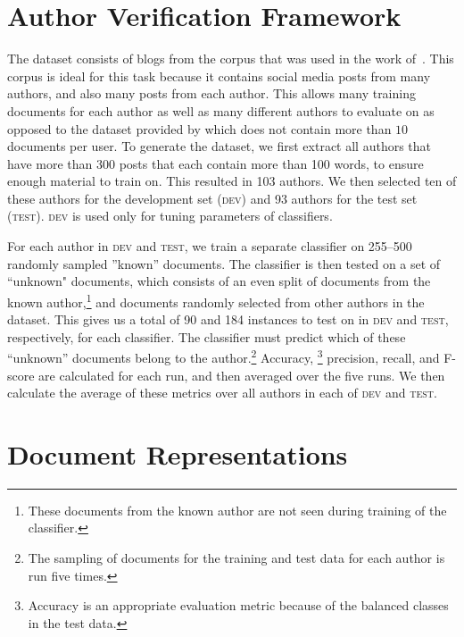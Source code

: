 \documentclass[11pt]{article}
\newcommand\dev{\textsc{dev}\xspace}
\newcommand\test{\textsc{test}\xspace}
\begin{document}
\section{Author Verification Framework}\label{sec:overview}
The dataset consists of blogs from the corpus that was used in the work of~\cite{schler2006effects}. This corpus is ideal for this task because it contains social media posts from many authors, and also many posts from each author. This allows many training documents for each author as well as many different authors to evaluate on as opposed to the dataset provided by \cite{stamatatos:2014} which does not contain more than $10$ documents per user. To generate the dataset, we first extract all authors that have more than 300 posts that each contain more than 100 words, to ensure enough material to train on. This resulted in 103 authors. We then selected ten of these authors for the development set (\dev) and 93 authors for the test set (\test). \dev is used only for tuning parameters of classifiers. 

For each author in \dev and \test, we train a separate classifier on 255--500 randomly sampled ''known''
documents. The classifier is then tested on a set of
``unknown" documents, which consists of an even split of documents from the known
author,\footnote{These documents from the known author are not seen
  during training of the classifier.} and documents randomly
selected from other authors in the dataset. This gives us a total of 90 and 184 instances to test on in \dev and \test, respectively, for each classifier. The classifier must
predict which of these ``unknown'' documents belong to the author.\footnote{ The
sampling of documents for the training and test data for
each author is run five times.} Accuracy, \footnote{Accuracy is an appropriate evaluation metric because of the balanced classes in the test data.} precision, recall, and
F-score are calculated for each run, and then averaged over the five
runs. We then calculate the average of these metrics over all authors
in each of \dev and \test.



\section{Document Representations}\label{sec:representation}
\end{document}
